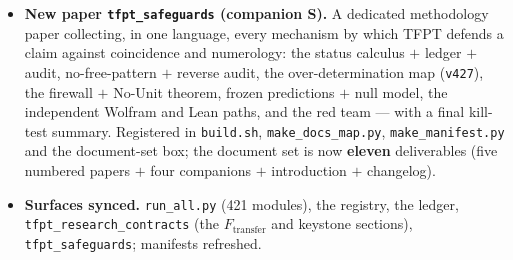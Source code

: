 \begin{itemize}
\item \textbf{New paper \texttt{tfpt\_safeguards} (companion S).} A dedicated methodology paper collecting,
in one language, every mechanism by which TFPT defends a claim against coincidence and numerology: the
status calculus $+$ ledger $+$ audit, no-free-pattern $+$ reverse audit, the over-determination map
(\texttt{v427}), the firewall $+$ No-Unit theorem, frozen predictions $+$ null model, the independent
Wolfram and Lean paths, and the red team --- with a final kill-test summary. Registered in
\texttt{build.sh}, \texttt{make\_docs\_map.py}, \texttt{make\_manifest.py} and the document-set box; the
document set is now \textbf{eleven} deliverables (five numbered papers $+$ four companions $+$ introduction
$+$ changelog).
\item \textbf{Surfaces synced.} \texttt{run\_all.py} (421 modules), the registry, the ledger,
\texttt{tfpt\_research\_contracts} (the $F_{\mathrm{transfer}}$ and keystone sections),
\texttt{tfpt\_safeguards}; manifests refreshed.
\end{itemize}


